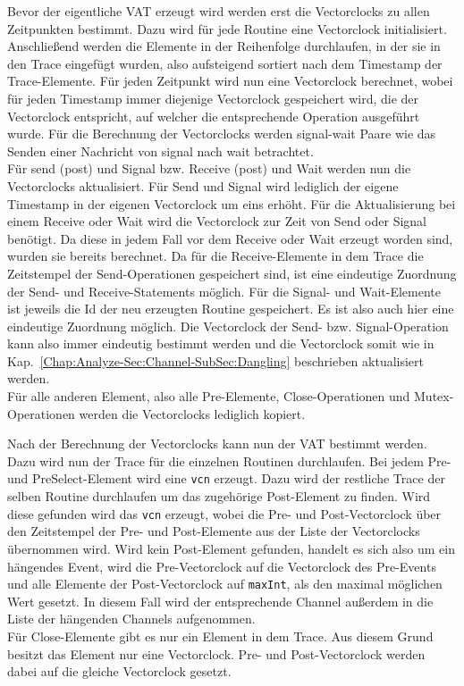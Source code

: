 Bevor der eigentliche VAT erzeugt wird werden erst die Vectorclocks zu allen
Zeitpunkten bestimmt. Dazu wird für jede Routine eine Vectorclock initialisiert. 
Anschließend werden die Elemente in der Reihenfolge durchlaufen, in der sie 
in den Trace eingefügt wurden, also aufsteigend sortiert nach dem Timestamp 
der Trace-Elemente. Für jeden Zeitpunkt wird nun eine Vectorclock berechnet,
wobei für jeden Timestamp immer diejenige Vectorclock gespeichert wird, die 
der Vectorclock entspricht, auf welcher die entsprechende Operation ausgeführt wurde.
Für die Berechnung der Vectorclocks werden signal-wait Paare wie das Senden 
einer Nachricht von signal nach wait betrachtet.\\
Für send (post) und Signal bzw. Receive (post) und Wait werden nun die Vectorclocks 
aktualisiert.
Für Send und Signal wird lediglich der eigene Timestamp in der eigenen 
Vectorclock um eins erhöht. Für die Aktualisierung bei einem Receive oder Wait 
wird die Vectorclock zur Zeit von Send oder Signal benötigt. Da diese in jedem 
Fall vor dem Receive oder Wait erzeugt worden sind, wurden sie bereits berechnet.
Da für die Receive-Elemente in dem Trace die Zeitstempel der Send-Operationen 
gespeichert sind, ist eine eindeutige Zuordnung der Send- und Receive-Statements 
möglich. Für die Signal- und Wait-Elemente ist jeweils die Id der neu erzeugten 
Routine gespeichert. Es ist also auch hier eine eindeutige Zuordnung möglich. 
Die Vectorclock der Send- bzw. Signal-Operation kann also immer eindeutig bestimmt 
werden und die Vectorclock somit wie in Kap.~\ref{Chap:Analyze-Sec:Channel-SubSec:Dangling}
beschrieben aktualisiert werden.\\
Für alle anderen Element, also alle Pre-Elemente, Close-Operationen und Mutex-Operationen 
werden die Vectorclocks lediglich kopiert.

Nach der Berechnung der Vectorclocks kann nun der VAT bestimmt werden. 
Dazu wird nun der Trace für die einzelnen Routinen durchlaufen. Bei jedem 
Pre- und PreSelect-Element wird eine \texttt{vcn} erzeugt. Dazu wird der restliche Trace 
der selben Routine durchlaufen um das zugehörige Post-Element zu finden. 
Wird diese gefunden wird 
das \texttt{vcn} erzeugt, wobei die Pre- und Post-Vectorclock über den 
Zeitstempel der Pre- und Post-Elemente aus der Liste der Vectorclocks 
übernommen wird.
Wird kein Post-Element gefunden, handelt es sich also um ein hängendes Event, 
wird die Pre-Vectorclock auf die Vectorclock des Pre-Events und alle Elemente 
der Post-Vectorclock auf \texttt{maxInt}, als den maximal möglichen Wert 
gesetzt. In diesem Fall wird der entsprechende Channel außerdem in die Liste der
hängenden Channels aufgenommen. 
\\
Für Close-Elemente gibt es nur ein Element in dem Trace. Aus diesem Grund 
besitzt das Element nur eine Vectorclock. Pre- und Post-Vectorclock werden 
dabei auf die gleiche Vectorclock gesetzt.

